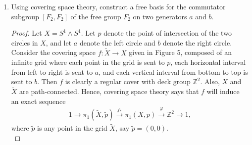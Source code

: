 \documentclass{article}
\begin{document}
\begin{enumerate}[label={\bf Q\arabic*:}]
    \begin{proof}
      Assume by contradiction that $f$ is not finite-sheeted. Define an
      open cover $\mathcal{O}$ of $\widetilde{X}$ by the set of all sheets
      lying above each point $x$ in $X$, i.e.
      \begin{equation*}
        \mathcal{O} := \bigcup_{x\in X}
          \{\widetilde{U}_{\alpha,x}:\alpha\in A\}.
      \end{equation*}
      From compactness of $\widetilde{X}$, $\mathcal{O}$ contains a finite
      sub-cover $\mathcal{U}\subset\mathcal{O}$. Write $\mathcal{U}$ as
      \begin{equation*}
        \mathcal{U} := \bigcup_{i=1}^n \widetilde{U}_{\alpha_i,x_i}.
      \end{equation*}
      Consider the sheets of $x_1$. Each sheet $\widetilde{U}_{\alpha,x_1}$
      of $x_1$ must be contained in some sheet in $\mathcal{U}$, which
      implies that the degree of $x_1$ is at most $n$. Since the degree of
      a cover is independent on the choice of $x\in X$, $f$ must have
      degree no more than $n$, a contradiction.
    \end{proof}

  \item Using covering space theory, construct a free basis for the
    commutator subgroup $[F_2,F_2]$ of the free group $F_2$ on two
    generators $a$ and $b$.

    \begin{proof}
      Let $X=S^1\wedge S^1$. Let $p$ denote the point of intersection of
      the two circles in $X$, and let $a$ denote the left circle and $b$
      denote the right circle. Consider the covering space
      $f:\widetilde{X}\rightarrow X$ given in Figure 5, composed of an
      infinite grid where each point in the grid is sent to $p$, each
      horizontal interval from left to right is sent to $a$, and each
      vertical interval from bottom to top is sent to $b$. Then $f$ is
      clearly a regular cover with deck group $\mathbb{Z}^2$. Also, $X$ and
      $\widetilde{X}$ are path-connected. Hence, covering space theory says
      that $f$ will induce an exact sequence
      \begin{align*}
        1\rightarrow \pi_1(\widetilde{X},\widetilde{p})\xrightarrow{f_*}
          \pi_1(X,p)\xrightarrow{\varphi} \mathbb{Z}^2\rightarrow 1,
      \end{align*}
      where $\widetilde{p}$ is any point in the grid $\widetilde{X}$, say
      $\widetilde{p}=(0,0)$. \\


\end{proof}
\end{enumerate}
\end{document}
